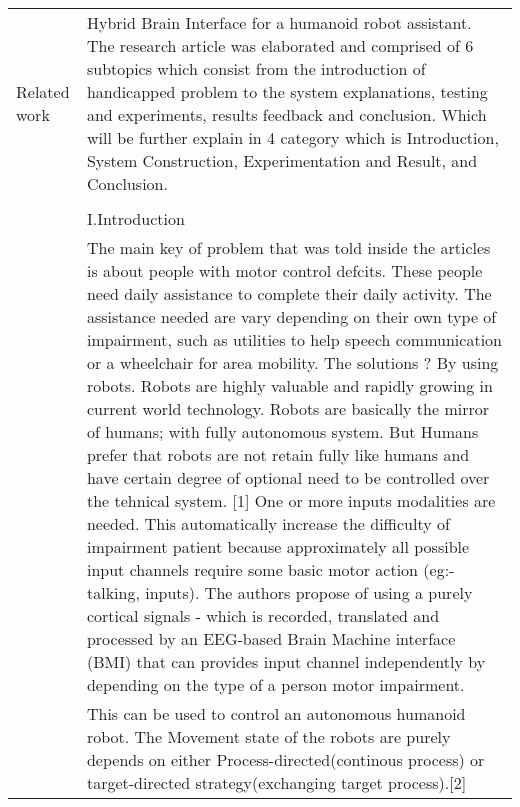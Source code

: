 \documentclass[a4paper, 12pt]{article}
\begin{document}
\begin{tabular}{| m{12em} | m{28em} |}
Related work & 
Hybrid Brain Interface for a humanoid robot assistant. The research article was elaborated 
and comprised of 6 subtopics which consist from the introduction of handicapped problem to 
the system explanations, testing and experiments, results feedback and conclusion. Which 
will be further explain in 4 category which is Introduction, System Construction, 
Experimentation and Result, and Conclusion. \\
& \\
& I.Introduction\\
& The main key of problem that was told inside the articles is about people with motor 
control defcits. These people need daily assistance to complete their daily activity. The 
assistance needed are vary depending on their own type of impairment, such as utilities to 
help speech communication or a wheelchair for area mobility. The solutions ? By using 
robots. Robots are highly valuable and rapidly growing in current world technology. Robots 
are basically the mirror of humans; with fully autonomous system. But Humans prefer that 
robots are not retain fully like humans and have certain degree of optional need to be 
controlled over the tehnical system. [1] One or more inputs modalities are needed. This 
automatically increase the difficulty of impairment patient because approximately all 
possible input channels require some basic motor action (eg:- talking, inputs). The 
authors propose of using a purely cortical signals - which is recorded, translated and 
processed by an EEG-based Brain Machine interface (BMI) that can provides input channel 
independently by depending on the type of a person motor impairment. 
\\

\hline
& This can be used to 
control an autonomous humanoid robot. The Movement state of the robots are purely depends on either Process-directed(continous 
process) or target-directed strategy(exchanging target process).[2] \\


\end{tabular}
\end{document}
